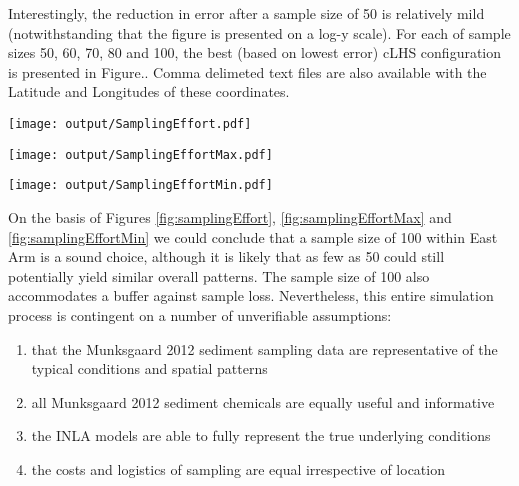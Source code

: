 \documentclass[a4paper]{article}
\let\origfigure=\figure
\let\endorigfigure=\endfigure
\renewenvironment{figure}[1][]{%
   \origfigure[H]
}{%
   \endorigfigure
}
\begin{document}
Interestingly, the reduction in error after a sample size of 50 is
relatively mild (notwithstanding that the figure is presented on a log-y
scale). For each of sample sizes 50, 60, 70, 80 and 100, the best (based
on lowest error) cLHS configuration is presented in Figure.. Comma
delimeted text files are also available with the Latitude and Longitudes
of these coordinates.

\begin{figure}
\centering\scriptsize\scriptsize
\texttt{[image: output/SamplingEffort.pdf]}
\caption{Comparison of the mean Error conditional on sample size and
sampling method for the East Arm\label{fig:samplingEffort}}
\end{figure}

\begin{figure}
\centering\scriptsize\scriptsize
\texttt{[image: output/SamplingEffortMax.pdf]}
\caption{Comparison of the maximum Error conditional on sample size and
sampling method for the East Arm\label{fig:samplingEffortMax}}
\end{figure}

\begin{figure}
\centering\scriptsize\scriptsize
\texttt{[image: output/SamplingEffortMin.pdf]}
\caption{Comparison of the minimum Error conditional on sample size and
sampling method for the East Arm\label{fig:samplingEffortMin}}
\end{figure}

On the basis of Figures \ref{fig:samplingEffort},
\ref{fig:samplingEffortMax} and \ref{fig:samplingEffortMin} we could
conclude that a sample size of 100 within East Arm is a sound choice,
although it is likely that as few as 50 could still potentially yield
similar overall patterns. The sample size of 100 also accommodates a
buffer against sample loss. Nevertheless, this entire simulation process
is contingent on a number of unverifiable assumptions:

\begin{enumerate}
\def\labelenumi{\arabic{enumi}.}
\tightlist
\item
  that the Munksgaard 2012 sediment sampling data are representative of
  the typical conditions and spatial patterns
\item
  all Munksgaard 2012 sediment chemicals are equally useful and
  informative
\item
  the INLA models are able to fully represent the true underlying
  conditions
\item
  the costs and logistics of sampling are equal irrespective of location
\end{enumerate}
\end{document}
